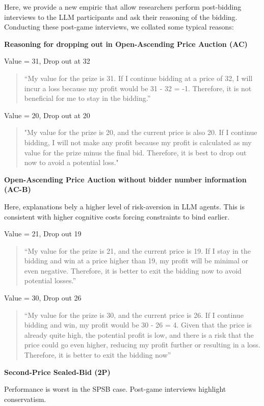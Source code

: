 \documentclass{article} %
\begin{document}
Here, we provide a new empiric that allow researchers perform post-bidding interviews to the LLM participants and ask their reasoning of the bidding. Conducting these post-game interviews, we collated some typical reasons:

\textbf{Reasoning for dropping out in Open-Ascending Price Auction (AC)}


Value = 31, Drop out at 32
\begin{quote}
    “My value for the prize is 31. If I continue bidding at a price of 32, I will incur a loss because my profit would be 31 - 32 = -1. Therefore, it is not beneficial for me to stay in the bidding.”
\end{quote}

Value = 20, Drop out at 20
\begin{quote}
    "My value for the prize is 20, and the current price is also 20. If I continue bidding, I will not make any profit because my profit is calculated as my value for the prize minus the final bid. Therefore, it is best to drop out now to avoid a potential loss."
\end{quote}

\textbf{Open-Ascending Price Auction without bidder number information (AC-B)}

Here, explanations bely a higher level of risk-aversion in LLM agents. This is consistent with higher cognitive costs forcing constraints to bind earlier.

Value = 21,  Drop out 19
\begin{quote}
    “My value for the prize is 21, and the current price is 19. If I stay in the bidding and win at a price higher than 19, my profit will be minimal or even negative. Therefore, it is better to exit the bidding now to avoid potential losses.”
\end{quote}

Value = 30,  Drop out 26
\begin{quote}
“My value for the prize is 30, and the current price is 26. If I continue bidding and win, my profit would be 30 - 26 = 4. Given that the price is already quite high, the potential profit is low, and there is a risk that the price could go even higher, reducing my profit further or resulting in a loss. Therefore, it is better to exit the bidding now”
\end{quote}


\textbf{Second-Price Sealed-Bid (2P)}

Performance is worst in the SPSB case. Post-game interviews highlight conservatism.
\end{document}
